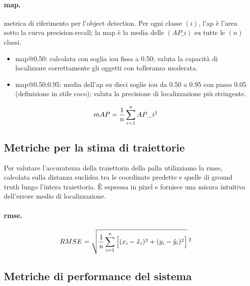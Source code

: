 \documentclass[12pt,a4paper,openright,twoside]{book}
\begin{document}
\paragraph{\acf{map}.} metrica di riferimento per l'object detection. 
Per ogni classe $(i)$, l'\ac{ap} è l'area sotto la curva precision-recall; 
la \ac{map} è la media delle $(AP\_i)$ su tutte le $(n)$ classi.
\begin{itemize}
  \item \ac{map}@0.50: calcolata con soglia \ac{iou} fissa a 0.50; valuta la capacità di localizzare 
  correttamente gli oggetti con tolleranza moderata.
  \item \ac{map}@0.50:0.95: media dell'\ac{ap} su dieci soglie \ac{iou} da 0.50 a 0.95 con passo 0.05 
  (definizione in stile \ac{coco}); valuta la precisione di localizzazione più stringente.
\end{itemize}
\begin{equation}
  \label{eq:map}
  {mAP} = \frac{1}{n} \sum_{i=1}^{n} AP\_i \footnotemark
\end{equation}

\subsection{Metriche per la stima di traiettorie}
\label{sec:metriche-traiettorie}
Per valutare l'accuratezza della traiettoria della palla utilizziamo la \ac{rmse}, calcolata sulla distanza euclidea
tra le coordinate predette e quelle di ground truth lungo l'intera traiettoria. È espressa in pixel e fornisce una misura
intuitiva dell'errore medio di localizzazione.

\paragraph{\ac{rmse}.}
\begin{equation}
  \label{eq:rmse_2d}
  {RMSE} = \sqrt{\frac{1}{n}\sum_{i=1}^{n}\Big[(x_i - \hat{x}_i)^2 + (y_i - \hat{y}_i)^2\Big]}\,\footnotemark
\end{equation}

\subsection{Metriche di performance del sistema}
\end{document}
